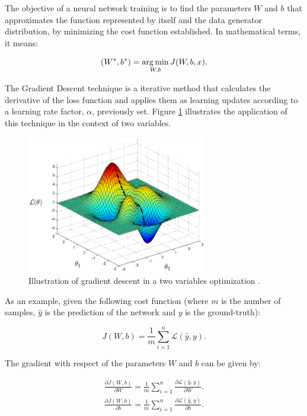 The objective of a neural network training is to find the parameters $W$ and $b$ that approximates the function represented by itself and the data generator distribution, by minimizing the cost function established. In mathematical terms, it means:

\begin{equation}
(W^{*},b^{*}) = \operatorname*{arg\,min}_{W,b}J(W, b, x).
\end{equation}


The Gradient Descent technique is a iterative method that calculates the derivative of the loss function and applies them as learning updates according to a learning rate factor, $\alpha$, previously set. Figure \ref{fig:gradientdescent} illustrates the application of this technique in the context of two variables.

\begin{figure}[!htbp]
	\centering
	\includegraphics[width=0.7\textwidth]{Cap3/gradientdescent.eps}
	\caption{Illustration of gradient descent in a two variables optimization
	\cite{tgilharco}.
	}
	\label{fig:gradientdescent}
\end{figure}


As an example, given the following cost function (where $m$ is the number of samples, $\hat{y}$ is the prediction of the network and $y$ is the ground-truth):

\begin{equation}
J(W,b) = \frac{1}{m}\sum^{n}_{i = 1}\mathcal{L}(\hat{y}, y).
\end{equation}


The gradient with respect of the parameters $W$ and $b$ can be given by:

\begin{align}
\frac{\partial{J(W,b)}}{\partial{W}} = \frac{1}{m}\sum^{n}_{i = 1}\frac{\partial{\mathcal{L}(\hat{y}, y)}}{\partial{W}}.\\
\frac{\partial{J(W,b)}}{\partial{b}} = \frac{1}{m}\sum^{n}_{i = 1}\frac{\partial{\mathcal{L}(\hat{y}, y)}}{\partial{b}}.
\end{align}

